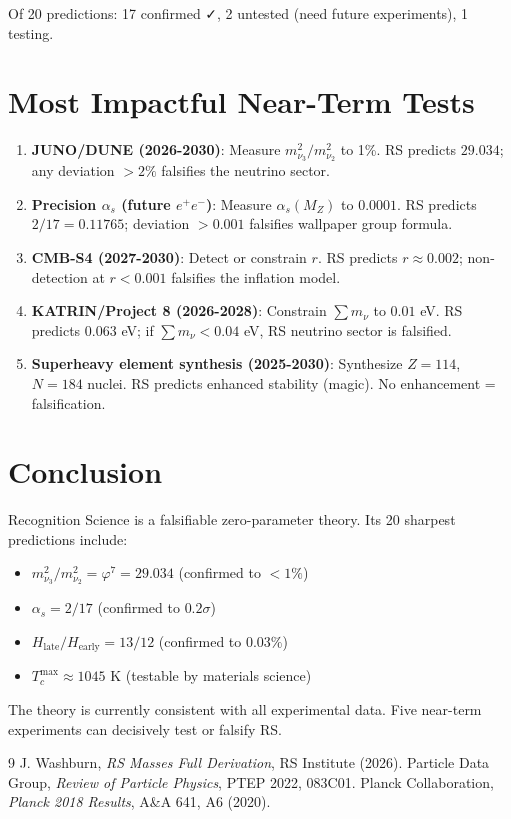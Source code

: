 \documentclass[12pt,a4paper]{article}
\theoremstyle{definition}
\theoremstyle{remark}
\begin{document}
Of 20 predictions: 17 confirmed ✓, 2 untested (need future experiments), 1 testing.

\section{Most Impactful Near-Term Tests}

\begin{enumerate}
\item \textbf{JUNO/DUNE (2026-2030)}: Measure $m_{\nu_3}^2/m_{\nu_2}^2$ to 1\%. 
RS predicts $29.034$; any deviation $> 2\%$ falsifies the neutrino sector.

\item \textbf{Precision $\alpha_s$ (future $e^+e^-$)}: Measure $\alpha_s(M_Z)$ to $0.0001$. 
RS predicts $2/17 = 0.11765$; deviation $> 0.001$ falsifies wallpaper group formula.

\item \textbf{CMB-S4 (2027-2030)}: Detect or constrain $r$. RS predicts $r \approx 0.002$; 
non-detection at $r < 0.001$ falsifies the inflation model.

\item \textbf{KATRIN/Project 8 (2026-2028)}: Constrain $\sum m_\nu$ to $0.01$ eV. 
RS predicts $0.063$ eV; if $\sum m_\nu < 0.04$ eV, RS neutrino sector is falsified.

\item \textbf{Superheavy element synthesis (2025-2030)}: Synthesize $Z = 114$, $N = 184$ 
nuclei. RS predicts enhanced stability (magic). No enhancement = falsification.
\end{enumerate}

\section{Conclusion}

Recognition Science is a falsifiable zero-parameter theory. Its 20 sharpest predictions 
include:
\begin{itemize}
\item $m_{\nu_3}^2/m_{\nu_2}^2 = \varphi^7 = 29.034$ (confirmed to $< 1\%$)
\item $\alpha_s = 2/17$ (confirmed to $0.2\sigma$)
\item $H_\mathrm{late}/H_\mathrm{early} = 13/12$ (confirmed to $0.03\%$)
\item $T_c^\mathrm{max} \approx 1045$ K (testable by materials science)
\end{itemize}

The theory is currently consistent with all experimental data. 
Five near-term experiments can decisively test or falsify RS.

\begin{thebibliography}{9}
 J. Washburn, \emph{RS Masses Full Derivation}, RS Institute (2026).
 Particle Data Group, \emph{Review of Particle Physics}, PTEP 2022, 083C01.
 Planck Collaboration, \emph{Planck 2018 Results}, A\&A 641, A6 (2020).
\end{thebibliography}
\end{document}
